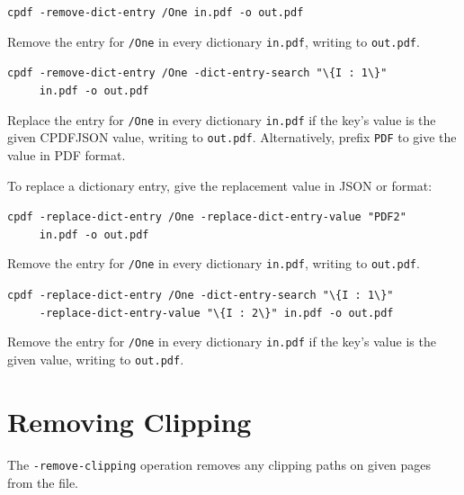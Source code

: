 \documentclass{book}
\begin{document}
  \begin{framed}
  \small\noindent\verb!cpdf -remove-dict-entry /One in.pdf -o out.pdf!

  \vspace{2.5mm}
  \noindent Remove the entry for \texttt{/One} in every dictionary \texttt{in.pdf}, writing to \texttt{out.pdf}. 

  \vspace{2.5mm}

  \small\noindent\verb!cpdf -remove-dict-entry /One -dict-entry-search "\{I : 1\}"!\\
  \small\noindent\verb!     in.pdf -o out.pdf!

  \vspace{2.5mm}
  \noindent Replace the entry for \texttt{/One} in every dictionary \texttt{in.pdf} if the key's value is the given CPDFJSON value, writing to \texttt{out.pdf}. Alternatively, prefix \texttt{PDF} to give the value in PDF format.
  \end{framed}

\noindent To replace a dictionary entry, give the replacement value in JSON or format:

  \begin{framed}
  \small\noindent\verb!cpdf -replace-dict-entry /One -replace-dict-entry-value "PDF2"!\\
  \small\noindent\verb!     in.pdf -o out.pdf!

  \vspace{2.5mm}
  \noindent Remove the entry for \texttt{/One} in every dictionary \texttt{in.pdf}, writing to \texttt{out.pdf}. 

  \vspace{2.5mm}

  \small\noindent\verb!cpdf -replace-dict-entry /One -dict-entry-search "\{I : 1\}"!\\
  \small\noindent\verb!     -replace-dict-entry-value "\{I : 2\}" in.pdf -o out.pdf!

  \vspace{2.5mm}
  \noindent Remove the entry for \texttt{/One} in every dictionary \texttt{in.pdf} if the key's value is the given value, writing to \texttt{out.pdf}. 
  \end{framed}

\section{Removing Clipping}


The \texttt{-remove-clipping} operation removes any clipping paths on given pages from the file.
\end{document}

